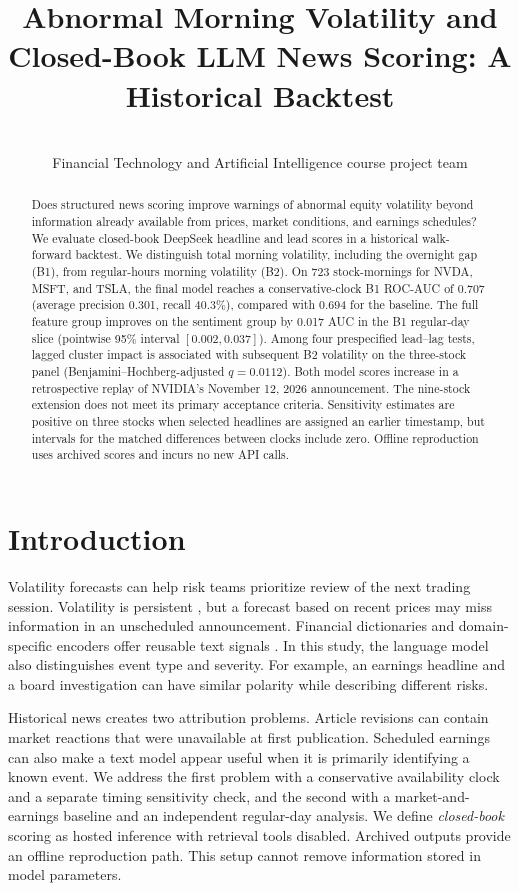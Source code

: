 \documentclass{article}
\title{Abnormal Morning Volatility and Closed-Book LLM News Scoring: A Historical Backtest}
\author{\reportauthors\\
Financial Technology and Artificial Intelligence course project team}
\begin{document}
\maketitle

\begin{abstract}
Does structured news scoring improve warnings of abnormal equity volatility beyond information already available from prices, market conditions, and earnings schedules? We evaluate closed-book DeepSeek headline and lead scores in a historical walk-forward backtest. We distinguish total morning volatility, including the overnight gap (B1), from regular-hours morning volatility (B2). On 723 stock-mornings for NVDA, MSFT, and TSLA, the final model reaches a conservative-clock B1 ROC-AUC of 0.707 (average precision 0.301, recall 40.3\%), compared with 0.694 for the baseline. The full feature group improves on the sentiment group by 0.017 AUC in the B1 regular-day slice (pointwise 95\% interval $[0.002, 0.037]$). Among four prespecified lead--lag tests, lagged cluster impact is associated with subsequent B2 volatility on the three-stock panel (Benjamini--Hochberg-adjusted $q=0.0112$). Both model scores increase in a retrospective replay of NVIDIA's November 12, 2026 announcement. The nine-stock extension does not meet its primary acceptance criteria. Sensitivity estimates are positive on three stocks when selected headlines are assigned an earlier timestamp, but intervals for the matched differences between clocks include zero. Offline reproduction uses archived scores and incurs no new API calls.
\end{abstract}

\section{Introduction}
\label{sec:intro}

Volatility forecasts can help risk teams prioritize review of the next trading session. Volatility is persistent \citep{engle1982autoregressive}, but a forecast based on recent prices may miss information in an unscheduled announcement. Financial dictionaries and domain-specific encoders offer reusable text signals \citep{loughran2011liability,araci2019finbert}. In this study, the language model also distinguishes event type and severity. For example, an earnings headline and a board investigation can have similar polarity while describing different risks.

Historical news creates two attribution problems. Article revisions can contain market reactions that were unavailable at first publication. Scheduled earnings can also make a text model appear useful when it is primarily identifying a known event. We address the first problem with a conservative availability clock and a separate timing sensitivity check, and the second with a market-and-earnings baseline and an independent regular-day analysis. We define \emph{closed-book} scoring as hosted inference with retrieval tools disabled. Archived outputs provide an offline reproduction path. This setup cannot remove information stored in model parameters.
\end{document}
